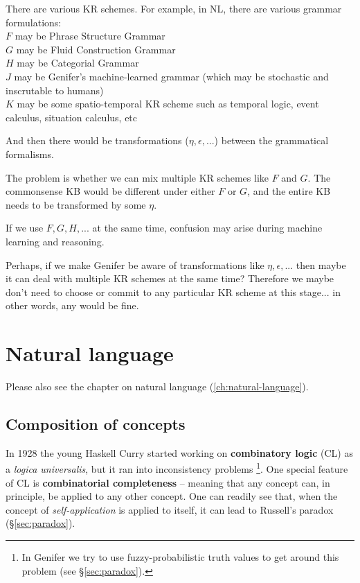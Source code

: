 There are various KR schemes.  For example, in NL, there are various grammar formulations:\\
$F$ may be Phrase Structure Grammar\\
$G$ may be Fluid Construction Grammar\\
$H$ may be Categorial Grammar\\
$J$ may be Genifer's machine-learned grammar (which may be stochastic and inscrutable to humans)\\
$K$ may be some spatio-temporal KR scheme such as temporal logic, event calculus, situation calculus, etc

And then there would be transformations ($\eta, \epsilon, ...$) between the grammatical formalisms.

The problem is whether we can mix multiple KR schemes like $F$ and $G$.  The commonsense KB would be different under either $F$ or $G$, and the entire KB needs to be transformed by some $\eta$.

If we use $F, G, H,...$ at the same time, confusion may arise during machine learning and reasoning.

Perhaps, if we make Genifer be aware of transformations like $\eta, \epsilon, ...$ then maybe it can deal with multiple KR schemes at the same time?  Therefore we maybe don't need to choose or commit to any particular KR scheme at this stage...  in other words, any would be fine.

\section{Natural language}

Please also see the chapter on natural language (\ref{ch:natural-language}).

\subsection{Composition of concepts}
\label{sec:composition}

In 1928 the young Haskell Curry started working on \textbf{combinatory logic} (CL) as a \textit{logica universalis}, but it ran into inconsistency problems \footnote{In Genifer we try to use fuzzy-probabilistic truth values to get around this problem (see \S\ref{sec:paradox}).}.  One special feature of CL is \textbf{combinatorial completeness} -- meaning that any concept can, in principle, be applied to any other concept.  One can readily see that, when the concept of \textit{self-application} is applied to itself, it can lead to Russell's paradox (\S\ref{sec:paradox}).


